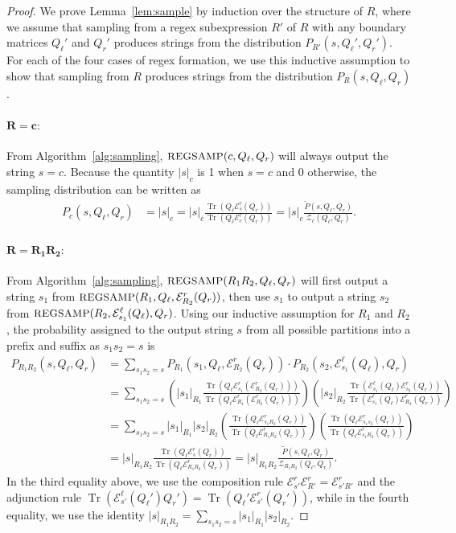 \documentclass[twoside]{article}
\newcommand{\Sample}{\textsc{\small REGSAMP}}
\DeclareMathOperator{\Tr}{Tr}
\newcommand{\EL}{\mc{E}^{\scriptstyle \ell}}
\newcommand{\ER}{\mc{E}^{\scriptstyle r}}
\newcommand{\QL}{Q_{\ell}}
\newcommand{\QR}{Q_{r}}
\newcommand{\sRone}{|s_1|_{R_1}}
\newcommand{\sRtwo}{|s_2|_{R_2}}
\newcommand{\Pt}{\tilde{P}}
\newcommand{\mc}[1]{\mathcal{#1}}
\begin{document}
\begin{proof}

We prove Lemma~\ref{lem:sample} by induction over the structure of $R$, where we assume that sampling from a regex subexpression $R'$ of $R$ with any boundary matrices $\QL'$ and $\QR'$ produces strings from the distribution $P_{R'}(s, \QL', \QR')$. For each of the four cases of regex formation, we use this inductive assumption to show that sampling from $R$ produces strings from the distribution $P_R(s, \QL, \QR)$.

\paragraph{$\mathbf{R = c:}$} From Algorithm~\ref{alg:sampling},
$\Sample(c, \QL, \QR)$ will always output the string $s = c$. Because the quantity $|s|_c$ is 1 when $s = c$ and 0 otherwise, the sampling distribution can be written as
%
\begin{align*}
    P_c(s, \QL, \QR) &= |s|_c = |s|_c \frac{\Tr(\QL \ER_s(\QR))}{\Tr(\QL \ER_c(\QR))} = |s|_c \frac{\Pt(s, \QL, \QR)}{\mc{Z}_c(\QL, \QR)}.
\end{align*}
   
\paragraph{$\mathbf{R = R_1 R_2:}$} From Algorithm~\ref{alg:sampling},
$\Sample(R_1 R_2, \QL, \QR)$ will first output a string $s_1$ from $\Sample(R_1, \QL, \ER_{R_2}(\QR))$, then use $s_1$ to output a string $s_2$ from $\Sample(R_2, \EL_{s_1}(\QL), \QR)$. Using our inductive assumption for $R_1$ and $R_2$, the probability assigned to the output string $s$ from all possible partitions into a prefix and suffix as $s_1 s_2 = s$ is
%
\begin{align*}
    P_{R_1 R_2}(s, \QL, \QR) &= \sum_{s_1 s_2 = s} P_{R_1}(s_1, \QL, \ER_{R_2}(\QR)) \cdot P_{R_2}(s_2, \EL_{s_1}(\QL), \QR) \\
    &= \sum_{s_1 s_2 = s} \left( \sRone \frac{\Tr(\QL \ER_{s_1}(\ER_{R_2}(\QR)))}{\Tr(\QL \ER_{R_1}(\ER_{R_2}(\QR)))} \right) \left( \sRtwo \frac{\Tr(\EL_{s_1}(\QL) \ER_{s_2}(\QR))}{\Tr(\EL_{s_1}(\QL) \ER_{R_2}(\QR))} \right) \\
    &= \sum_{s_1 s_2 = s} \sRone \sRtwo \left(\frac{\Tr(\QL \ER_{s_1 R_2}(\QR))}{\Tr(\QL \ER_{R_1 R_2}(\QR))}\right) \left(\frac{\Tr(\QL \ER_{s_1 s_2}(\QR))}{\Tr(\QL \ER_{s_1 R_2}(\QR))}\right) \\
    &= |s|_{R_1 R_2} \frac{\Tr(\QL \ER_{s}(\QR))}{\Tr(\QL \ER_{R_1 R_2}(\QR))} = |s|_{R_1 R_2} \frac{\Pt(s, \QL, \QR)}{\mc{Z}_{R_1 R_2}(\QL, \QR)}.
\end{align*}
%
In the third equality above, we use the composition rule $\ER_{s'}\ER_{R'} = \ER_{s' R'}$ and the adjunction rule $\Tr(\EL_{s'}(\QL') \QR') = \Tr(\QL' \ER_{s'}(\QR'))$, while in the fourth equality, we use the identity $|s|_{R_1 R_2} = \sum_{s_1 s_2 = s} |s_1|_{R_1} |s_2|_{R_2}$.


\end{proof}
\end{document}

